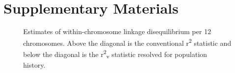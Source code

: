 \section{Supplementary Materials}


\begin{figure}[H]

{\centering {}

}

\caption{Estimates of within-chromosome linkage disequilibrium per 12
chromosomes. Above the diagonal is the conventional r\textsuperscript{2}
statistic and below the diagonal is the
r\textsuperscript{2}\textsubscript{v} statistic resolved for population
history.}

\end{figure}%

